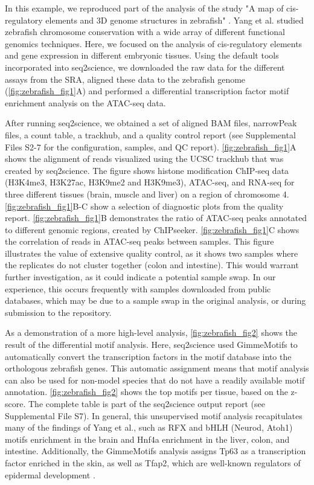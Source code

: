 In this example, we reproduced part of the analysis of the study "A map of cis-regulatory elements and 3D genome structures in zebrafish" \cite{Yang2020}. Yang et al. studied zebrafish chromosome conservation with a wide array of different functional genomics techniques. Here, we focused on the analysis of cis-regulatory elements and gene expression in different embryonic tissues. Using the default tools incorporated into seq2science, we downloaded the raw data for the different assays from the SRA, aligned these data to the zebrafish genome (\autoref{fig:zebrafish_fig1}A) and performed a differential transcription factor motif enrichment analysis on the ATAC-seq data. 

After running seq2science, we obtained a set of aligned BAM files, narrowPeak files, a count table, a trackhub, and a quality control report (see Supplemental Files S2-7 for the configuration, samples, and QC report). \autoref{fig:zebrafish_fig1}A shows the alignment of reads visualized using the UCSC trackhub that was created by seq2science. The figure shows histone modification ChIP-seq data (H3K4me3, H3K27ac, H3K9me2 and H3K9me3), ATAC-seq, and RNA-seq for three different tissues (brain, muscle and liver) on a region of chromosome 4. \autoref{fig:zebrafish_fig1}B-C show a selection of diagnostic plots from the quality report. \autoref{fig:zebrafish_fig1}B demonstrates the ratio of ATAC-seq peaks annotated to different genomic regions, created by ChIPseeker. \autoref{fig:zebrafish_fig1}C shows the correlation of reads in ATAC-seq peaks between samples. This figure illustrates the value of extensive quality control, as it shows two samples where the replicates do not cluster together (colon and intestine). This would warrant further investigation, as it could indicate a potential sample swap. In our experience, this occurs frequently with samples downloaded from public databases, which may be due to a sample swap in the original analysis, or during submission to the repository. 

As a demonstration of a more high-level analysis, \autoref{fig:zebrafish_fig2} shows the result of the differential motif analysis. Here, seq2science used GimmeMotifs to automatically convert the transcription factors in the motif database into the orthologous zebrafish genes. This automatic assignment means that motif analysis can also be used for non-model species that do not have a readily available motif annotation. \autoref{fig:zebrafish_fig2} shows the top motifs per tissue, based on the z-score. The complete table is part of the seq2science output report (see Supplemental File S7). In general, this unsupervised motif analysis recapitulates many of the findings of Yang et al., such as RFX and bHLH (Neurod, Atoh1) motifs enrichment in the brain and Hnf4a enrichment in the liver, colon, and intestine. Additionally, the GimmeMotifs analysis assigns Tp63 as a transcription factor enriched in the skin, as well as Tfap2, which are well-known regulators of epidermal development \cite{Soares2017,Li2019}.   

